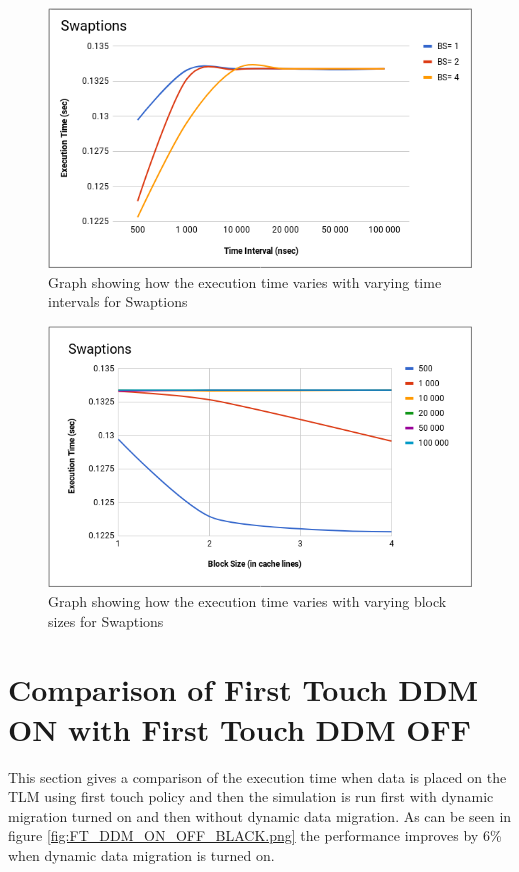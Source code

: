 \documentclass{listhesis}
\begin{document}
\begin{figure}
  \includegraphics[width=\linewidth]{Swapt_var_bs_t.png}
  \centering
  \caption{Graph showing how the execution time varies with varying time intervals for Swaptions}
  \label{fig:Swapt_var_bs_t.png}
\end{figure}

\begin{figure}
  \includegraphics[width=\linewidth]{Swap_var_bs_fordiff_t.png}
  \centering
  \caption{Graph showing how the execution time varies with varying block sizes for Swaptions}
  \label{fig:Swap_var_bs_fordiff_t.png}
\end{figure}



\section{Comparison of First Touch DDM ON with First Touch DDM OFF}
This section gives a comparison of the execution time when data is placed on the TLM using first touch policy and then the simulation is run first with dynamic migration turned on and then without dynamic data migration. As can be seen in figure \ref{fig:FT_DDM_ON_OFF_BLACK.png} the performance improves by 6\% when dynamic data migration is turned on. 
\end{document}
